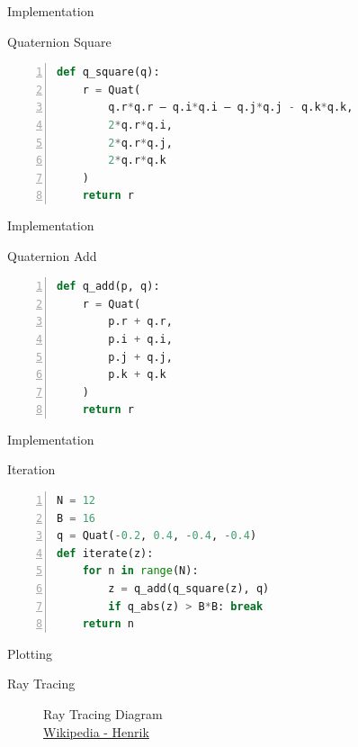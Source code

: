 \documentclass[aspectratio=169,t]{beamer}
\begin{document}
\begin{frame}[label={sec:orge4df58f},fragile]{Implementation}
 \begin{block}{Quaternion Square}
\begin{lstlisting}[language=Python,firstnumber=1,numbers=left]
def q_square(q):
    r = Quat(
        q.r*q.r – q.i*q.i – q.j*q.j - q.k*q.k,
        2*q.r*q.i,
        2*q.r*q.j,
        2*q.r*q.k
    )
    return r
\end{lstlisting}
\end{block}
\end{frame}

\begin{frame}[label={sec:orgc335b9f},fragile]{Implementation}
 \begin{block}{Quaternion Add}
\begin{lstlisting}[language=Python,firstnumber=1,numbers=left]
def q_add(p, q):
    r = Quat(
        p.r + q.r,
        p.i + q.i,
        p.j + q.j,
        p.k + q.k
    )
    return r
\end{lstlisting}
\end{block}
\end{frame}

\begin{frame}[label={sec:org9a17ceb},fragile]{Implementation}
 \begin{block}{Iteration}
\begin{lstlisting}[language=Python,firstnumber=1,numbers=left]
N = 12
B = 16
q = Quat(-0.2, 0.4, -0.4, -0.4)
def iterate(z):
    for n in range(N):
        z = q_add(q_square(z), q)
        if q_abs(z) > B*B: break
    return n
\end{lstlisting}
\end{block}
\end{frame}

\begin{frame}[label={sec:orgf1d75bc}]{Plotting}
\end{frame}

\begin{frame}[label={sec:org9d8488f}]{Ray Tracing}
\begin{figure}[htbp]


\caption{Ray Tracing Diagram \\ \ccbysa \href{https://commons.wikimedia.org/wiki/File:Ray\_trace\_diagram.svg}{Wikipedia - Henrik}}
\end{figure}
\end{frame}
\end{document}
